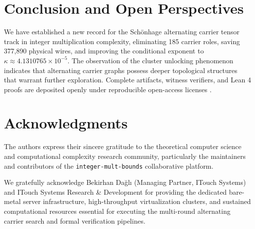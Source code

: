 \documentclass[11pt,a4paper]{article}
\begin{document}
\section{Conclusion and Open Perspectives}

We have established a new record for the Sch\"{o}nhage alternating carrier tensor track in integer multiplication complexity, eliminating 185 carrier roles, saving 377,890 physical wires, and improving the conditional exponent to $\kappa \approx 4.1310765 \times 10^{-5}$. The observation of the cluster unlocking phenomenon indicates that alternating carrier graphs possess deeper topological structures that warrant further exploration. Complete artifacts, witness verifiers, and Lean 4 proofs are deposited openly under reproducible open-access licenses \cite{zenodo2026}.

\section*{Acknowledgments}
The authors express their sincere gratitude to the theoretical computer science and computational complexity research community, particularly the maintainers and contributors of the \texttt{integer-mult-bounds} collaborative platform.

We gratefully acknowledge Bekirhan Da\u{g}l\i{} (Managing Partner, ITouch Systems) and ITouch Systems Research \& Development for providing the dedicated bare-metal server infrastructure, high-throughput virtualization clusters, and sustained computational resources essential for executing the multi-round alternating carrier search and formal verification pipelines.
\end{document}
